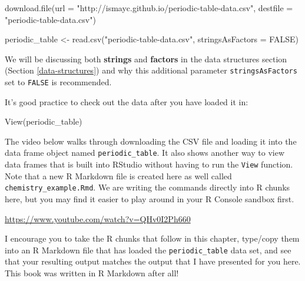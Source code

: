 \documentclass[]{tufte-book}
\newenvironment{Shaded}{\begin{snugshade}}{\end{snugshade}}
\newcommand{\AttributeTok}[1]{\textcolor[rgb]{0.77,0.63,0.00}{#1}}
\newcommand{\ConstantTok}[1]{\textcolor[rgb]{0.00,0.00,0.00}{#1}}
\newcommand{\FunctionTok}[1]{\textcolor[rgb]{0.00,0.00,0.00}{#1}}
\newcommand{\NormalTok}[1]{#1}
\newcommand{\OtherTok}[1]{\textcolor[rgb]{0.56,0.35,0.01}{#1}}
\newcommand{\StringTok}[1]{\textcolor[rgb]{0.31,0.60,0.02}{#1}}
\begin{document}
\begin{Shaded}
\begin{Highlighting}[]
\FunctionTok{download.file}\NormalTok{(}\AttributeTok{url =} \StringTok{"http://ismayc.github.io/periodic{-}table{-}data.csv"}\NormalTok{,}
 \AttributeTok{destfile =} \StringTok{"periodic{-}table{-}data.csv"}\NormalTok{)}
\end{Highlighting}
\end{Shaded}

\begin{Shaded}
\begin{Highlighting}[]
\NormalTok{periodic\_table }\OtherTok{\textless{}{-}} \FunctionTok{read.csv}\NormalTok{(}\StringTok{"periodic{-}table{-}data.csv"}\NormalTok{,}
              \AttributeTok{stringsAsFactors =} \ConstantTok{FALSE}\NormalTok{)}
\end{Highlighting}
\end{Shaded}

We will be discussing both \textbf{strings} and \textbf{factors} in the data structures section (Section \ref{data-structures}) and why this additional parameter \texttt{stringsAsFactors} set to \texttt{FALSE} is recommended.

It's good practice to check out the data after you have loaded it in:

\begin{Shaded}
\begin{Highlighting}[]
\FunctionTok{View}\NormalTok{(periodic\_table)}
\end{Highlighting}
\end{Shaded}

The video below walks through downloading the CSV file and loading it into the data frame object named \texttt{periodic\_table}. It also shows another way to view data frames that is built into RStudio without having to run the \texttt{View} function. Note that a new R Markdown file is created here as well called \texttt{chemistry\_example.Rmd}. We are writing the commands directly into R chunks here, but you may find it easier to play around in your R Console sandbox first.

\vspace{0.1in}\begin{center}\footnotesize{\url{https://www.youtube.com/watch?v=QHv0I2Ph660}}\end{center}\vspace{0.1in}

I encourage you to take the R chunks that follow in this chapter, type/copy them into an R Markdown file that has loaded the \texttt{periodic\_table} data set, and see that your resulting output matches the output that I have presented for you here. This book was written in R Markdown after all!
\end{document}
